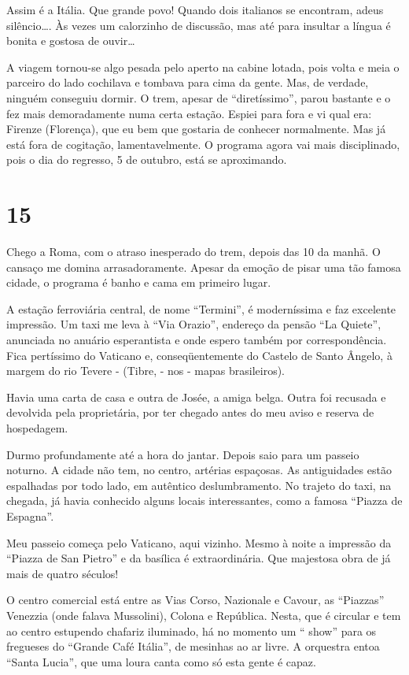 Assim é a Itália. Que grande povo! Quando dois italianos se encontram, adeus silêncio\ldots. Às vezes um calorzinho de discussão, mas até para insultar a língua é bonita e gostosa de ouvir\ldots

A viagem tornou-se algo pesada pelo aperto na cabine lotada, pois volta e meia o parceiro do lado cochilava e tombava para cima da gente. Mas, de verdade, ninguém conseguiu dormir. O trem, apesar de “diretíssimo”, parou bastante e o fez mais demoradamente numa certa estação. Espiei para fora e vi qual era: Firenze (Florença), que eu bem que gostaria de conhecer normalmente. Mas já está fora de cogitação, lamentavelmente. O programa agora vai mais disciplinado, pois o dia do regresso, 5 de outubro, está se aproximando.

\section*{15 \adfflatleafright {}}
Chego a Roma, com o atraso inesperado do trem, depois das 10 da manhã. O cansaço me domina arrasadoramente. Apesar da emoção de pisar uma tão famosa cidade, o programa é banho e cama em primeiro lugar.

A estação ferroviária central, de nome “Termini”, é moderníssima e faz excelente impressão. Um taxi me leva à “Via Orazio”, endereço da pensão “La Quiete”, anunciada no anuário esperantista e onde espero também por correspondência. Fica pertíssimo do Vaticano e, conseqüentemente do Castelo de Santo Ângelo, à margem do rio Tevere - (Tibre, - nos - mapas brasileiros).

Havia uma carta de casa e outra de Josée, a amiga belga. Outra foi recusada e devolvida pela proprietária, por ter chegado antes do meu aviso e reserva de hospedagem.

Durmo profundamente até a hora do jantar. Depois saio para um passeio noturno. A cidade não tem, no centro, artérias espaçosas. As antiguidades estão espalhadas por todo lado, em autêntico deslumbramento. No trajeto do taxi, na chegada, já havia conhecido alguns locais interessantes, como a famosa “Piazza de Espagna”.

Meu passeio começa pelo Vaticano, aqui vizinho. Mesmo à noite a impressão da “Piazza de San Pietro” e da basílica é extraordinária. Que majestosa obra de já mais de quatro séculos!

O centro comercial está entre as Vias Corso, Nazionale e Cavour, as “Piazzas” Venezzia (onde falava Mussolini), Colona e República. Nesta, que é circular e tem ao centro estupendo chafariz iluminado, há no momento um “ show” para os fregueses do “Grande Café Itália”, de mesinhas ao ar livre. A orquestra entoa “Santa Lucia”, que uma loura canta como só esta gente é capaz.

